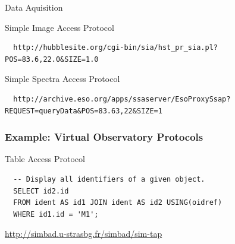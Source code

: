 \documentclass[fleqn]{beamer}
\begin{document}
\begin{section}{Data Aquisition}
\begin{frame}[containsverbatim]
Simple Image Access Protocol

\begin{lstlisting}
  http://hubblesite.org/cgi-bin/sia/hst_pr_sia.pl?POS=83.6,22.0&SIZE=1.0
\end{lstlisting}

Simple Spectra Access Protocol

\begin{lstlisting}
  http://archive.eso.org/apps/ssaserver/EsoProxySsap?REQUEST=queryData&POS=83.63,22&SIZE=1
\end{lstlisting}

\end{frame}

\begin{frame}[containsverbatim]\frametitle{Example: Virtual
    Observatory Protocols}

Table Access Protocol
\begin{lstlisting}
  -- Display all identifiers of a given object.
  SELECT id2.id
  FROM ident AS id1 JOIN ident AS id2 USING(oidref)
  WHERE id1.id = 'M1';
\end{lstlisting}

\url{http://simbad.u-strasbg.fr/simbad/sim-tap}

\end{frame}

\end{section}


\end{document}
